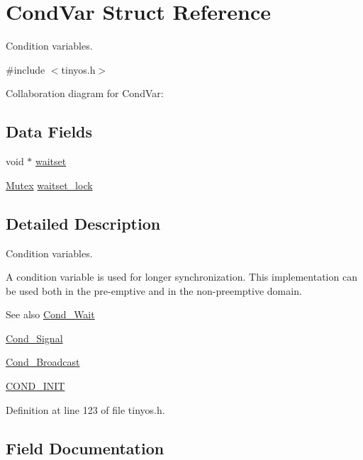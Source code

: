 \hypertarget{structCondVar}{}\section{Cond\+Var Struct Reference}
\label{structCondVar}


Condition variables.  




{\ttfamily \#include $<$tinyos.\+h$>$}



Collaboration diagram for Cond\+Var\+:
\subsection*{Data Fields}
\begin{DoxyCompactItemize}
\item 
void $\ast$ \hyperlink{structCondVar_a7da9e0169713c3b3ae386a8ab49f7e34}{waitset}
\item 
\hyperlink{group__syscalls_gaef2ec62cae8e0031fd19fc8b91083ade}{Mutex} \hyperlink{structCondVar_a477b855f4d3880d231206ae79bd5b6cf}{waitset\+\_\+lock}
\end{DoxyCompactItemize}


\subsection{Detailed Description}
Condition variables. 

A condition variable is used for longer synchronization. This implementation can be used both in the pre-\/emptive and in the non-\/preemptive domain.

\begin{DoxySeeAlso}{See also}
\hyperlink{group__syscalls_ga970dca2210b3f2ec8aedab7f542a9bf4}{Cond\+\_\+\+Wait} 

\hyperlink{group__syscalls_ga43f64f8be273d2fe77d7de5f4b81e22d}{Cond\+\_\+\+Signal} 

\hyperlink{group__syscalls_ga8196aa2a48cad90742f254cc3b8fd351}{Cond\+\_\+\+Broadcast} 

\hyperlink{group__syscalls_ga6a7055a466bff255172e05f6ec82d792}{C\+O\+N\+D\+\_\+\+I\+N\+IT} 
\end{DoxySeeAlso}


Definition at line 123 of file tinyos.\+h.



\subsection{Field Documentation}
